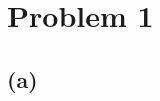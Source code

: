 \documentclass[a4paper]{article}
\begin{document}
\section*{Problem 1}
\subsection*{(a)}
\end{document}
